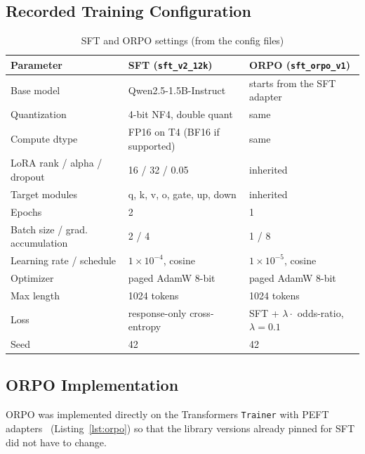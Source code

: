 \documentclass[11pt,a4paper]{article}
\newcommand{\code}[1]{\texttt{#1}}
\begin{document}
\subsection{Recorded Training Configuration}
\begin{table}[H]
\centering
\caption{SFT and ORPO settings (from the config files)}
\label{tab:traincfg}
\small
\begin{tabular}{@{}lll@{}}
\toprule
\textbf{Parameter} & \textbf{SFT (\code{sft\_v2\_12k})} & \textbf{ORPO (\code{sft\_orpo\_v1})}\\
\midrule
Base model & Qwen2.5-1.5B-Instruct & starts from the SFT adapter\\
Quantization & 4-bit NF4, double quant & same\\
Compute dtype & FP16 on T4 (BF16 if supported) & same\\
LoRA rank / alpha / dropout & 16 / 32 / 0.05 & inherited\\
Target modules & q, k, v, o, gate, up, down & inherited\\
Epochs & 2 & 1\\
Batch size / grad. accumulation & 2 / 4 & 1 / 8\\
Learning rate / schedule & $1\times10^{-4}$, cosine & $1\times10^{-5}$, cosine\\
Optimizer & paged AdamW 8-bit & paged AdamW 8-bit\\
Max length & 1024 tokens & 1024 tokens\\
Loss & response-only cross-entropy & SFT + $\lambda \cdot$ odds-ratio, $\lambda=0.1$\\
Seed & 42 & 42\\
\bottomrule
\end{tabular}
\end{table}

\subsection{ORPO Implementation}
ORPO was implemented directly on the Transformers \code{Trainer} with PEFT adapters~\cite{hftransformers} (Listing~\ref{lst:orpo}) so that the
library versions already pinned for SFT did not have to change.
\end{document}
